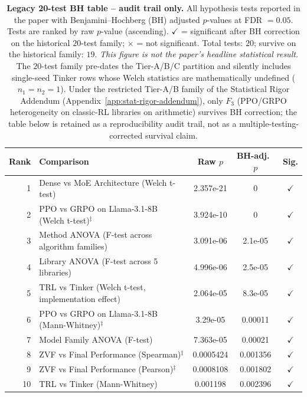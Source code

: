 \documentclass{article}
\begin{document}
\begin{table}[!ht]
\centering
\caption{\textbf{Legacy 20-test BH table -- audit trail only.} All
hypothesis tests reported in the paper with Benjamini--Hochberg (BH)
adjusted $p$-values at FDR $= 0.05$.  Tests are ranked by raw
$p$-value (ascending). $\checkmark$ = significant after BH correction
on the historical $20$-test family; $\times$ = not significant. Total
tests: $20$; survive on the historical family: $19$. \emph{This
figure is not the paper's headline statistical result.} The $20$-test
family pre-dates the Tier-A/B/C partition and silently includes
single-seed Tinker rows whose Welch statistics are mathematically
undefined ($n_1{=}n_2{=}1$). Under the restricted Tier-A/B family of
the Statistical Rigor Addendum (Appendix~\ref{app:stat-rigor-addendum}),
only $F_3$ (PPO/GRPO heterogeneity on classic-RL libraries on
arithmetic) survives BH correction; the table below is retained as a
reproducibility audit trail, not as a multiple-testing-corrected
survival claim.}
\label{tab:bh-pvalues}
\scriptsize
\begin{tabular}{@{}rp{6.2cm}ccc@{}}
\toprule
Rank & Comparison & Raw $p$ & BH-adj.\ $p$ & Sig. \\
\midrule
        1 & Dense vs MoE Architecture (Welch t-test) & 2.357e-21 & 0 & $\checkmark$ \\
        2 & PPO vs GRPO on Llama-3.1-8B (Welch t-test)$^{\ddag}$ & 3.924e-10 & 0 & $\checkmark$ \\
        3 & Method ANOVA (F-test across algorithm families) & 3.091e-06 & 2.1e-05 & $\checkmark$ \\
        4 & Library ANOVA (F-test across 5 libraries) & 4.996e-06 & 2.5e-05 & $\checkmark$ \\
        5 & TRL vs Tinker (Welch t-test, implementation effect) & 2.064e-05 & 8.3e-05 & $\checkmark$ \\
        6 & PPO vs GRPO on Llama-3.1-8B (Mann-Whitney)$^{\ddag}$ & 3.29e-05 & 0.00011 & $\checkmark$ \\
        7 & Model Family ANOVA (F-test) & 7.363e-05 & 0.00021 & $\checkmark$ \\
        8 & ZVF vs Final Performance (Spearman)$^{\ddag}$ & 0.0005424 & 0.001356 & $\checkmark$ \\
        9 & ZVF vs Final Performance (Pearson)$^{\ddag}$ & 0.0008108 & 0.001802 & $\checkmark$ \\
        10 & TRL vs Tinker (Mann-Whitney) & 0.001198 & 0.002396 & $\checkmark$ \\

\end{tabular}
\end{table}
\end{document}

